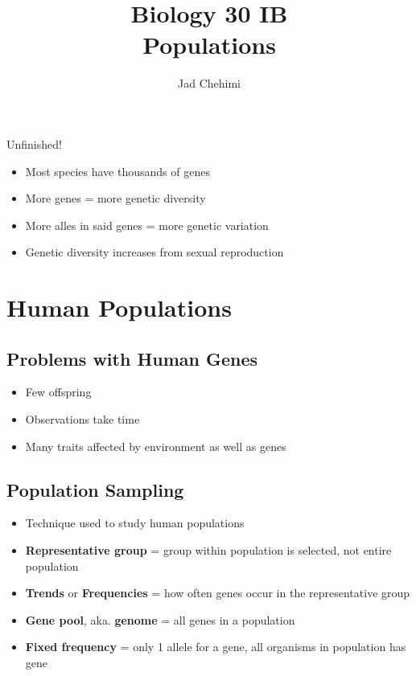 \documentclass[a4paper,12pt]{article}
\title{Biology 30 IB \\ Populations}
\author{Jad Chehimi}
\begin{document}
\maketitle

\begin{center}
\Huge
Unfinished!
\normalsize
\end{center}

\tableofcontents

\pagebreak

\begin{itemize}
    \item{Most species have thousands of genes}
    \item{More genes = more genetic diversity}
    \item{More alles in said genes = more genetic variation}
    \item{Genetic diversity increases from sexual reproduction}
\end{itemize}

\section{Human Populations}
\subsection{Problems with Human Genes}
\begin{itemize}
    \item{Few offspring}
    \item{Observations take time}
    \item{Many traits affected by environment as well as genes}
\end{itemize}

\subsection{Population Sampling}
\begin{itemize}
    \item{Technique used to study human populations}
    \item{\textbf{Representative group} = group within population is selected, not entire population}
    \item{\textbf{Trends} or \textbf{Frequencies} = how often genes occur in the representative group}
    \item{\textbf{Gene pool}, aka. \textbf{genome} = all genes in a population}
    \item{\textbf{Fixed frequency} = only 1 allele for a gene, all organisms in population has gene}
\end{itemize}
\end{document}
